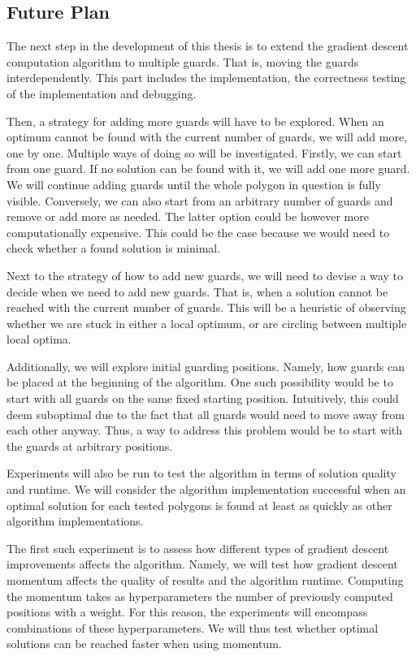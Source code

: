 \subsection{Future Plan}
The next step in the development of this thesis is to extend the gradient descent computation algorithm to multiple guards. That is, moving the guards interdependently. This part includes the implementation, the correctness testing of the implementation and debugging. 

Then, a strategy for adding more guards will have to be explored. When an optimum cannot be found with the current number of guards, we will add more, one by one. Multiple ways of doing so will be investigated. Firstly, we can start from one guard. If no solution can be found with it, we will add one more guard. We will continue adding guards until the whole polygon in question is fully visible. Conversely, we can also start from an arbitrary number of guards and remove or add more as needed. The latter option could be however more computationally expensive. This could be the case because we would need to check whether a found solution is minimal.

Next to the strategy of how to add new guards, we will need to devise a way to decide when we need to add new guards. That is, when a solution cannot be reached with the current number of guards. This will be a heuristic of observing whether we are stuck in either a local optimum, or are circling between multiple local optima.

Additionally, we will explore initial guarding positions. Namely, how guards can be placed at the beginning of the algorithm. One such possibility would be to start with all guards on the same fixed starting position. Intuitively, this could deem suboptimal due to the fact that all guards would need to move away from each other anyway. Thus, a way to address this problem would be to start with the guards at arbitrary positions.

Experiments will also be run to test the algorithm in terms of solution quality and runtime. We will consider the algorithm implementation successful when an optimal solution for each tested polygons is found at least as quickly as other algorithm implementations. 

The first such experiment is to assess how different types of gradient descent improvements affects the algorithm. Namely, we will test how gradient descent momentum \cite{goodfelow2016deep} affects the quality of results and the algorithm runtime. Computing the momentum takes as hyperparameters the number of previously computed positions with a weight. For this reason, the experiments will encompass combinations of these hyperparameters. We will thus test whether optimal solutions can be reached faster when using momentum.

